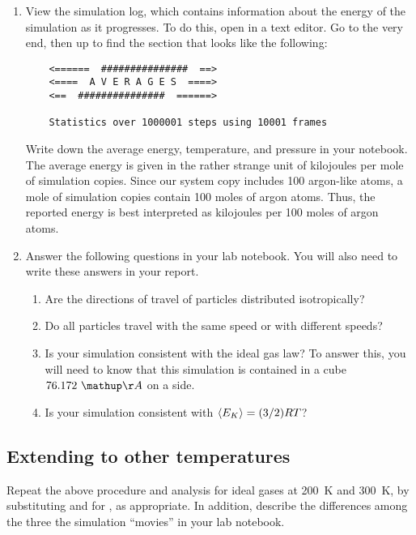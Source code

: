 \documentclass[10pt]{article}
\begin{document}
\begin{enumerate}
  \item View the simulation log, which contains information about the energy of the simulation as it progresses.
    To do this, open  in a text editor.
    Go to the very end, then up to find the section that looks like the following:
\begin{Verbatim}
	<======  ###############  ==>
	<====  A V E R A G E S  ====>
	<==  ###############  ======>

	Statistics over 1000001 steps using 10001 frames
\end{Verbatim}
    Write down the average energy, temperature, and pressure in your notebook.
    The average energy is given in the rather strange unit of kilojoules per mole of simulation copies.
    Since our system copy includes 100 argon-like atoms, a mole of simulation copies contain 100 moles of argon atoms.
    Thus, the reported energy is best interpreted as kilojoules per 100 moles of argon atoms.
    \item \label{item:ideal-questions}
    Answer the following questions in your lab notebook.
    You will also need to write these answers in your report.
    \begin{enumerate}
      \item Are the directions of travel of particles distributed isotropically?
      \item Do all particles travel with the same speed or with different speeds?
      \item Is your simulation consistent with the ideal gas law?
      To answer this, you will need to know that this simulation is contained in a cube $76.172\munit{\AA}$ on a side.
      \item Is your simulation consistent with $\left<E_K\right> = (3/2) R T$?
    \end{enumerate}
\end{enumerate}

\subsection{Extending to other temperatures}
Repeat the above procedure and analysis for ideal gases at 200~K and 300~K, by substituting  and  for , as appropriate.
In addition, describe the differences among the three the simulation ``movies'' in your lab notebook.

\end{document}
